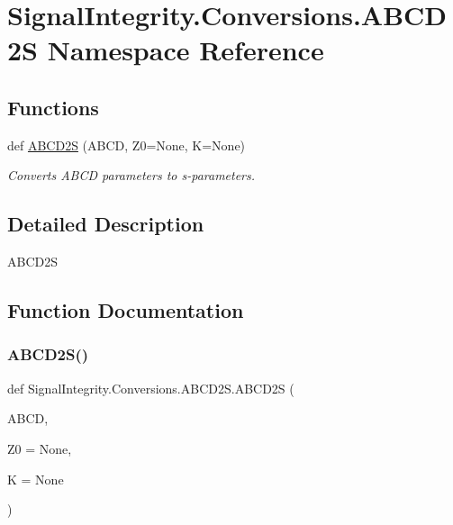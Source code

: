 \hypertarget{namespaceSignalIntegrity_1_1Conversions_1_1ABCD2S}{}\section{Signal\+Integrity.\+Conversions.\+A\+B\+C\+D2S Namespace Reference}
\label{namespaceSignalIntegrity_1_1Conversions_1_1ABCD2S}
\subsection*{Functions}
\begin{DoxyCompactItemize}
\item 
def \hyperlink{namespaceSignalIntegrity_1_1Conversions_1_1ABCD2S_a5e89900319a74f0bc8b0b0c460dbbd96}{A\+B\+C\+D2S} (A\+B\+CD, Z0=None, K=None)
\begin{DoxyCompactList}\small\item\em Converts A\+B\+CD parameters to s-\/parameters. \end{DoxyCompactList}\end{DoxyCompactItemize}


\subsection{Detailed Description}
\begin{DoxyVerb}ABCD2S\end{DoxyVerb}
 

\subsection{Function Documentation}
\mbox{\label{namespaceSignalIntegrity_1_1Conversions_1_1ABCD2S_a5e89900319a74f0bc8b0b0c460dbbd96}} 
\subsubsection{\texorpdfstring{A\+B\+C\+D2\+S()}{ABCD2S()}}
{\footnotesize\ttfamily def Signal\+Integrity.\+Conversions.\+A\+B\+C\+D2\+S.\+A\+B\+C\+D2S (\begin{DoxyParamCaption}\item[{}]{A\+B\+CD,  }\item[{}]{Z0 = {\ttfamily None},  }\item[{}]{K = {\ttfamily None} }\end{DoxyParamCaption})}



